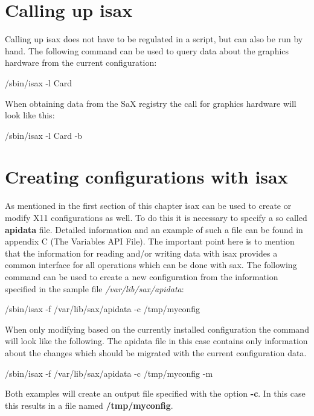 \section{Calling up isax}
Calling up isax does not have to be regulated in a script, but can also be run
by hand. The following command can be used to query data about the graphics
hardware from the current configuration:

\begin{Command}{5cm}
/sbin/isax -l Card
\end{Command}

When obtaining data from the SaX registry the call for graphics hardware
will look like this:

\begin{Command}{5cm}
/sbin/isax -l Card -b
\end{Command}

\section{Creating configurations with isax}
As mentioned in the first section of this chapter isax can be used
to create or modify X11 configurations as well. To do this it is
necessary to specify a so called \textbf{apidata} file. Detailed
information and an example of such a file can be found in appendix
C (The Variables API File). The important point here is to mention
that the information for reading and/or writing data with isax provides
a common interface for all operations which can be done with sax.
The following command can be used to create a new configuration
from the information specified in the sample file \textit{/var/lib/sax/apidata}:

\begin{Command}{11cm}
/sbin/isax -f /var/lib/sax/apidata -c /tmp/myconfig
\end{Command}

When only modifying based on the currently installed configuration
the command will look like the following. The apidata file in this case
contains only information about the changes which should be migrated
with the current configuration data.

\begin{Command}{11cm}
/sbin/isax -f /var/lib/sax/apidata -c /tmp/myconfig -m
\end{Command}

Both examples will create an output file specified with the option
\textbf{-c}. In this case this results in a file named
\textbf{/tmp/myconfig}.
